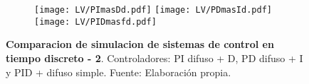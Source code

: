     \begin{figure}[htb]
        \centering
        \begin{subfigure}[t]{0.99\textwidth}
            \centering
            \texttt{[image: LV/PImasDd.pdf]}
            \texttt{[image: LV/PDmasId.pdf]}
            \texttt{[image: LV/PIDmasfd.pdf]}
            \label{fig:simD2}
        \end{subfigure}
        \caption[Comparacion de simulacion de sistemas de control discretos - 2]{\textbf{Comparacion de simulacion de sistemas de control en tiempo discreto - 2}. Controladores: PI difuso + D, PD difuso + I y PID + difuso simple. Fuente: Elaboración propia. \label{fig:simD2f}}
    \end{figure}